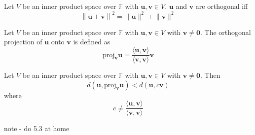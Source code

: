 \begin{theorem}
    Let \(V\) be an inner product space over \(\mathbb{F} \) with \(\mathbf{u},\mathbf{v}  \in V\). \(\mathbf{u} \) and \(\mathbf{v} \) are orthogonal iff 
    \[
        \left\lVert \mathbf{u} +\mathbf{v}  \right\rVert^2 = \lVert \mathbf{u}  \rVert^2 +\lVert \mathbf{v}  \rVert^2   
    \]
\end{theorem}
\begin{definition}
    Let \(V\) be an inner product space over \(\mathbb{F} \) with \(\mathbf{u},\mathbf{v}  \in V\) with \(\mathbf{v} \neq \mathbf{0} \). The orthogonal projection of \(\mathbf{u} \) onto \(\mathbf{v} \) is defined as 
    \[
        \text{proj}_{\mathbf{v} }\mathbf{u} =\frac{\langle \mathbf{u} ,\mathbf{v}  \rangle }{\langle \mathbf{v} ,\mathbf{v}  \rangle }\mathbf{v}   
    \]
\end{definition}
\begin{theorem}
    Let \(V\) be an inner product space over \(\mathbb{F} \) with \(\mathbf{u},\mathbf{v}  \in V\) with \(\mathbf{v} \neq \mathbf{0} \). Then 
    \[
        d\left( \mathbf{u} ,\text{proj}_{\mathbf{v} }\mathbf{u}    \right) < d \left( \mathbf{u} ,c \mathbf{v}  \right) 
    \]
    where
    \[
        c\neq \frac{\langle \mathbf{u} ,\mathbf{v}  \rangle }{\langle \mathbf{v} ,\mathbf{v}  \rangle }
    \]
\end{theorem}
note - do 5.3 at home
